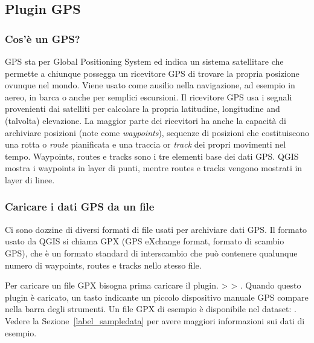 
\subsection{Plugin GPS }\label{label_plugingps}


\subsubsection{Cos'è un GPS?}\label{whatsgps}

GPS sta per Global Positioning System ed indica un sistema satellitare che permette a chiunque possegga un ricevitore GPS di trovare la propria posizione ovunque nel mondo.
Viene usato come ausilio nella navigazione, ad esempio in aereo, in barca o anche per semplici escursioni.
Il ricevitore GPS usa i segnali provenienti dai satelliti per calcolare la propria latitudine, longitudine and (talvolta) elevazione.
La maggior parte dei ricevitori ha anche la capacità di archiviare posizioni (note come \emph{waypoints}), sequenze di posizioni che costituiscono una rotta o \emph{route} pianificata e una traccia or \emph{track} dei propri movimenti nel tempo.
Waypoints, routes e tracks sono i tre elementi base dei dati GPS.
QGIS mostra i waypoints in layer di punti, mentre routes e tracks vengono mostrati in layer di linee.

\subsubsection{Caricare i dati GPS da un file}\label{label_loadgps}

Ci sono dozzine di diversi formati di file usati per archiviare dati GPS. Il formato usato da QGIS si chiama GPX (GPS eXchange format, formato di scambio GPS), che è un formato standard di interscambio che può contenere qualunque numero di waypoints, routes e tracks nello stesso file.

Per caricare un file GPX bisogna prima caricare il plugin.
 >  > . Quando questo plugin è caricato, un tasto indicante un piccolo dispositivo manuale GPS compare nella barra degli strumenti. Un file GPX di esempio è disponibile nel dataset:
. Vedere la Sezione~\ref{label_sampledata} per avere maggiori informazioni sui dati di esempio.

